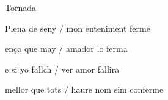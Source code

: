 \documentclass[12pt]{article}
\begin{document}
\begin{estrofaExtra}%




\begin{tornada}

Tornada

\end{tornada}


\end{estrofaExtra}


\begin{estrofa}

 Plena de seny / mon enteniment ferme

 en\c{c}o que may / amador lo ferma

 e si yo fallch / ver amor fallira

 mellor que tots / haure nom sim conferme

\end{estrofa}
\end{document}
